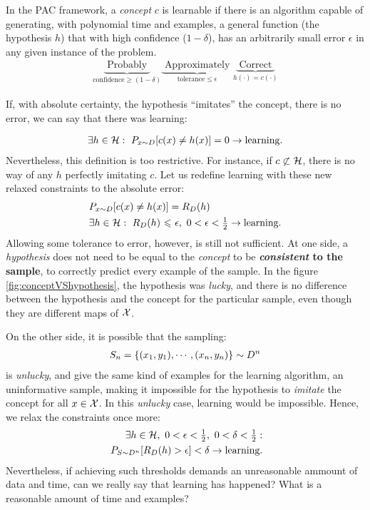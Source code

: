 In the PAC framework, a \emph{concept} \(c\) is learnable if there is an algorithm capable of generating, with polynomial time and examples, a general function (the hypothesis \(h\)) that with high confidence (\(1-\delta\)), has an arbitrarily small error \(\epsilon\) in any given instance of the problem.
\begin{align}
	\underbrace{\text{ Probably }}_{\textrm{confidence} \geq(1-\delta)} \underbrace{\text{ Approximately }}_{\textrm{tolerance} \leq\epsilon} \underbrace{\text{ Correct }}_{h(\cdot)=c(\cdot)}
\end{align}

If, with absolute certainty, the hypothesis ``imitates'' the concept, \ie there is no error, we can say that there was learning:

\begin{align}
	\exists h \in \mathcal{H}: ~ P_{{x} \sim D}[c({x})\neq h({x})]=0 \to \text{learning}.
\end{align}
Nevertheless, this definition is too restrictive. For instance, if \(c \not \subset \mathcal{H}\), there is no way of any \(h\) perfectly imitating \(c\). Let us redefine learning with these new relaxed constraints to the absolute error:
\begin{align}
	&P_{x \sim D}[c({x}) \neq h({x})]= R_{D}(h)\\
	&\exists h \in \mathcal{H}:~ R_{D}(h) {~\leqslant ~} \epsilon, ~ 0 < \epsilon < \tfrac{1}{2} \to \text{learning}.
\end{align}
Allowing some tolerance to error, however, is still not sufficient. At one side, a \emph{hypothesis} does not need to be equal to the \emph{concept} to be \textbf{\emph{consistent} to the sample}, \ie to correctly predict every example of the sample. In the figure \ref{fig:conceptVShypothesis}, the hypothesis was \emph{lucky}, and there is no difference between the hypothesis and the concept for the particular sample, even though they are different maps of \(\mathcal{X}\).

On the other side, it is possible that the sampling:
\begin{align}
	S_n = \{({x}_1,{y}_1), \cdots, ({x}_n, {y}_n)\} \sim D^n
\end{align}
is \emph{unlucky}, and give the same kind of examples for the learning algorithm, an uninformative sample, making it impossible for the hypothesis to \emph{imitate} the concept for all \({x} \in \mathcal{X}\). In this \emph{unlucky} case, learning would be impossible. Hence, we relax the constraints once more:
\begin{align}
	\exists h \in \mathcal{H}, ~0 < \epsilon < \tfrac{1}{2}, ~0 < \delta < \tfrac{1}{2}: \nonumber\\
	~P_{S \sim D^n}[R_{D}(h) > \epsilon] < \delta \to \text{learning}.
\end{align}
Nevertheless, if achieving such thresholds demands an unreasonable ammount of data and time, can we really say that learning has happened? What is a reasonable amount of time and examples?

